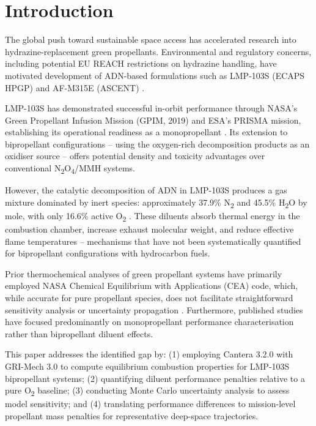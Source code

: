 \documentclass[review]{elsarticle}
\begin{document}
\linenumbers

\section{Introduction}

The global push toward sustainable space access has 
accelerated research into hydrazine-replacement green 
propellants. Environmental and regulatory concerns, 
including potential EU REACH restrictions on hydrazine 
handling, have motivated development of ADN-based 
formulations such as LMP-103S (ECAPS HPGP) and 
AF-M315E (ASCENT) \cite{Larsson2011, Bombelli2020}.

LMP-103S has demonstrated successful in-orbit 
performance through NASA's Green Propellant Infusion 
Mission (GPIM, 2019) and ESA's PRISMA mission, 
establishing its operational readiness as a monopropellant 
\cite{GPIM2019}. 
Its extension to bipropellant configurations -- using the 
oxygen-rich decomposition products as an oxidiser source -- 
offers potential density and toxicity advantages over 
conventional N\textsubscript{2}O\textsubscript{4}/MMH 
systems.

However, the catalytic decomposition of ADN in LMP-103S 
produces a gas mixture dominated by inert species: 
approximately 37.9\% N\textsubscript{2} and 45.5\% 
H\textsubscript{2}O by mole, with only 16.6\% active 
O\textsubscript{2} \cite{Larsson2011}. 
These diluents absorb thermal energy in the combustion 
chamber, increase exhaust molecular weight, and reduce 
effective flame temperatures -- mechanisms that have not 
been systematically quantified for bipropellant 
configurations with hydrocarbon fuels.

Prior thermochemical analyses of green propellant systems 
have primarily employed NASA Chemical Equilibrium with 
Applications (CEA) code, which, while accurate for pure 
propellant species, does not facilitate straightforward 
sensitivity analysis or uncertainty propagation 
\cite{Sharon2021}. 
Furthermore, published studies have focused predominantly 
on monopropellant performance characterisation rather 
than bipropellant diluent effects.

This paper addresses the identified gap by: (1) employing 
Cantera 3.2.0 with GRI-Mech 3.0 to compute equilibrium 
combustion properties for LMP-103S bipropellant systems; 
(2) quantifying diluent performance penalties relative 
to a pure O\textsubscript{2} baseline; (3) conducting 
Monte Carlo uncertainty analysis to assess model 
sensitivity; and (4) translating performance differences 
to mission-level propellant mass penalties for 
representative deep-space trajectories.
\end{document}
